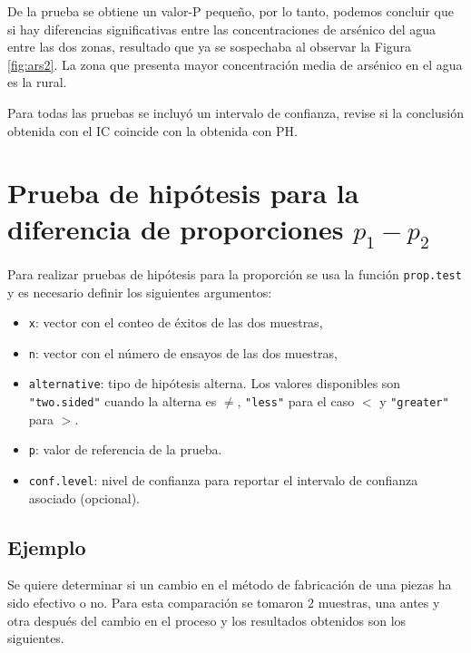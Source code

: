 \documentclass[
]{book}
\makeatletter
\providecommand{\tightlist}{%
  \setlength{\itemsep}{0pt}\setlength{\parskip}{0pt}}
\newenvironment{kframe}{%
\medskip{}
\setlength{\fboxsep}{.8em}
 \def\at@end@of@kframe{}%
 \ifinner\ifhmode%
  \def\at@end@of@kframe{\end{minipage}}%
  \begin{minipage}{\columnwidth}%
 \fi\fi%
 \def\FrameCommand##1{\hskip\@totalleftmargin \hskip-\fboxsep
 \colorbox{shadecolor}{##1}\hskip-\fboxsep
     \hskip-\linewidth \hskip-\@totalleftmargin \hskip\columnwidth}%
 \MakeFramed {\advance\hsize-\width
   \@totalleftmargin\z@ \linewidth\hsize
   \@setminipage}}%
 {\par\unskip\endMakeFramed%
 \at@end@of@kframe}
\newenvironment{rmdblock}[1]
  {
  \begin{itemize}
  \renewcommand{\labelitemi}{
    \raisebox{-.7\height}[0pt][0pt]{
      {\setkeys{Gin}{width=3em,keepaspectratio}\texttt{[image: images/\#1]}}
    }
  }
  \setlength{\fboxsep}{1em}
  \begin{kframe}
  \item
  }
  {
  \end{kframe}
  \end{itemize}
  }
\newenvironment{rmdtip}
  {\begin{rmdblock}{tip}}
  {\end{rmdblock}}
\makeatother
\begin{document}
De la prueba se obtiene un valor-P pequeño, por lo tanto, podemos concluir que si hay diferencias significativas entre las concentraciones de arsénico del agua entre las dos zonas, resultado que ya se sospechaba al observar la Figura \ref{fig:ars2}. La zona que presenta mayor concentración media de arsénico en el agua es la rural.

\begin{rmdtip}
Para todas las pruebas se incluyó un intervalo de confianza, revise si la conclusión obtenida con el IC coincide con la obtenida con PH.
\end{rmdtip}

\hypertarget{prueba-de-hipuxf3tesis-para-la-diferencia-de-proporciones-p_1---p_2}{%
\section{\texorpdfstring{Prueba de hipótesis para la diferencia de proporciones \(p_1 - p_2\)}{Prueba de hipótesis para la diferencia de proporciones p\_1 - p\_2}}\label{prueba-de-hipuxf3tesis-para-la-diferencia-de-proporciones-p_1---p_2}}

Para realizar pruebas de hipótesis para la proporción se usa la función \texttt{prop.test} y es necesario definir los siguientes argumentos:

\begin{itemize}
\tightlist
\item
  \texttt{x}: vector con el conteo de éxitos de las dos muestras,
\item
  \texttt{n}: vector con el número de ensayos de las dos muestras,
\item
  \texttt{alternative}: tipo de hipótesis alterna. Los valores disponibles son \texttt{"two.sided"} cuando la alterna es \(\neq\), \texttt{"less"} para el caso \(<\) y \texttt{"greater"} para \(>\).
\item
  \texttt{p}: valor de referencia de la prueba.
\item
  \texttt{conf.level}: nivel de confianza para reportar el intervalo de confianza asociado (opcional).
\end{itemize}

\hypertarget{ejemplo-73}{%
\subsection*{Ejemplo}\label{ejemplo-73}}

Se quiere determinar si un cambio en el método de fabricación de una piezas ha sido efectivo o no. Para esta comparación se tomaron 2 muestras, una antes y otra después del cambio en el proceso y los resultados obtenidos son los siguientes.
\end{document}
